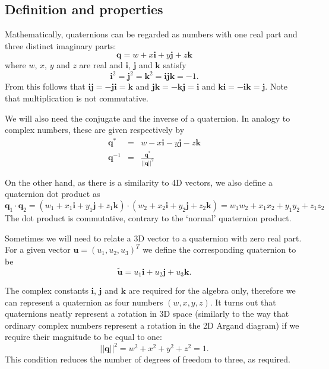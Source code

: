 \subsection{Definition and properties}
Mathematically, quaternions can be regarded as numbers with one real part and three
distinct imaginary parts:
\begin{equation}
\mathbf{q} = w + x\mathbf{i} + y\mathbf{j} + z\mathbf{k}
\end{equation}
where $w$, $x$, $y$ and $z$ are real and $\mathbf{i}$, $\mathbf{j}$ and $\mathbf{k}$ satisfy
\begin{equation}
\mathbf{i}^2 = \mathbf{j}^2 = \mathbf{k}^2 = \mathbf{i}\mathbf{j}\mathbf{k} = -1.
\end{equation}
From this follows that
$\mathbf{i}\mathbf{j} = -\mathbf{j}\mathbf{i} = \mathbf{k}$ and
$\mathbf{j}\mathbf{k} = -\mathbf{k}\mathbf{j} = \mathbf{i}$ and
$\mathbf{k}\mathbf{i} = -\mathbf{i}\mathbf{k} = \mathbf{j}$.
Note that multiplication is not commutative.

We will also need the conjugate and the inverse of a quaternion. In analogy to
complex numbers, these are given respectively by
\begin{eqnarray}
\mathbf{q}^\ast & = & w - x\mathbf{i} - y\mathbf{j} - z\mathbf{k}\\
\mathbf{q}^{-1} & = & \frac{\mathbf{q}^\ast}{||\mathbf{q}||^2}
\end{eqnarray}

On the other hand, as there is a similarity to 4D vectors, we also define a
quaternion dot product as
\begin{equation}
\mathbf{q}_1\cdot\mathbf{q}_2 =
    (w_1 + x_1\mathbf{i} + y_1\mathbf{j} + z_1\mathbf{k})\cdot
    (w_2 + x_2\mathbf{i} + y_2\mathbf{j} + z_2\mathbf{k}) =
    w_1 w_2 + x_1 x_2 + y_1 y_2 + z_1 z_2
\end{equation}
The dot product is commutative, contrary to the `normal' quaternion product.

Sometimes we will need to relate a 3D vector to a quaternion with zero real part.
For a given vector $\mathbf{u} = (u_1, u_2, u_3)^T$ we define the corresponding
quaternion to be
\begin{equation}
\label{vectorToQuat}
\tilde{\mathbf{u}} = u_1\mathbf{i} + u_2\mathbf{j} + u_3\mathbf{k}.
\end{equation}

The complex constants $\mathbf{i}$, $\mathbf{j}$ and $\mathbf{k}$ are required for the algebra
only, therefore we can represent a quaternion as four numbers $(w,x,y,z)$. It turns out that
quaternions neatly represent a rotation in 3D space (similarly to the way that ordinary complex
numbers represent a rotation in the 2D Argand diagram) if we require their magnitude to be
equal to one:
\begin{equation}
\label{unitQuat}
||\mathbf{q}||^2 = w^2 + x^2 + y^2 + z^2 = 1.
\end{equation}
This condition reduces the number of degrees of freedom to three, as required.

